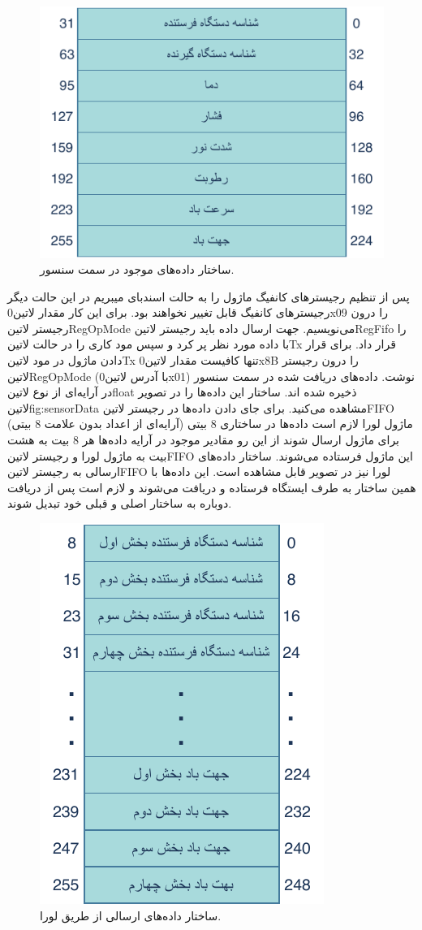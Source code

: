 \begin{figure}[H]
	\centering
	\includegraphics[width=0.6\linewidth]{Assets/sensorData.pdf}
	\caption{ساختار داده‌های موجود در سمت سنسور.}
	\label{fig:sensorData}
\end{figure}

پس از تنظیم رجیستر‌های کانفیگ ماژول را به حالت اسندبای میبریم در این حالت دیگر رجیستر‌های کانفیگ قابل تغییر نخواهند بود. برای این کار مقدار ‌لاتین{0x09} را درون رجیستر ‌لاتین{RegOpMode} می‌نویسیم. جهت ارسال داده باید رجیستر ‌لاتین{RegFifo} را با داده‌ مورد نظر پر کرد و سپس مود کاری را در حالت ‌لاتین{Tx} قرار‌ داد. برای قرار دادن ماژول در مود ‌لاتین{Tx} تنها کافیست مقدار ‌لاتین{0x8B} را درون رجیستر ‌لاتین{RegOpMode} (با آدرس ‌لاتین{0x01}) نوشت. داده‌های دریافت شده در سمت سنسور در آرایه‌ای از نوع ‌لاتین{float} ذخیره شده اند. ساختار این داده‌ها را در تصویر ‌لاتین{fig:sensorData} مشاهده می‌کنید. برای جای دادن داده‌ها در رجیستر ‌لاتین{FIFO} ماژول لورا لازم است داده‌ها در ساختاری 8 بیتی (آرایه‌ای از اعداد بدون علامت 8 بیتی) برای ماژول ارسال شوند از این رو مقادیر موجود در آرایه داده‌ها هر 8 بیت به هشت بیت به ماژول لورا و رجیستر ‌لاتین{FIFO} این ماژول فرستاده می‌شوند. ساختار داده‌های ارسالی به رجیستر ‌لاتین{FIFO} لورا نیز در تصویر  قابل مشاهده است. این داده‌ها با همین ساختار به طرف ایستگاه فرستاده و دریافت می‌شوند و لازم است پس از دریافت دوباره به ساختار اصلی و قبلی خود تبدیل شوند. 

\begin{figure}[H]
	\centering
	\includegraphics[width=0.4\linewidth]{Assets/loraData.pdf}
	\caption{ساختار داده‌های ارسالی از طریق لورا.}
	\label{fig:loraData}
\end{figure}

